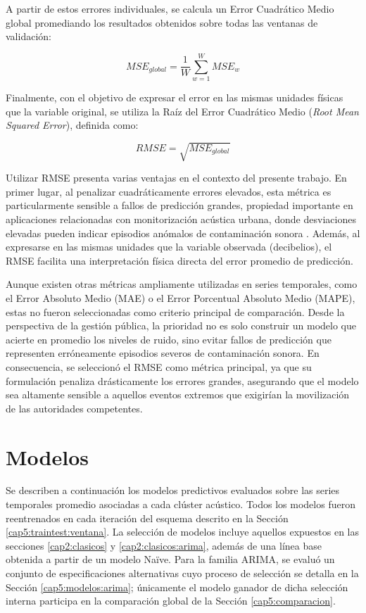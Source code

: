 A partir de estos errores individuales, se calcula un Error Cuadrático Medio global promediando los resultados obtenidos sobre todas las ventanas de validación:

\begin{equation}
    MSE_{global} = \frac{1}{W}\sum_{w=1}^{W} MSE_w
    \label{eq:mse_global}
\end{equation}

Finalmente, con el objetivo de expresar el error en las mismas unidades físicas que la variable original, se utiliza la Raíz del Error Cuadrático Medio (\textit{Root Mean Squared Error}), definida como:

\begin{equation}
    RMSE = \sqrt{MSE_{global}}
    \label{eq:rmse_global}
\end{equation}

Utilizar RMSE presenta varias ventajas en el contexto del presente trabajo. En primer lugar, al penalizar cuadráticamente errores elevados, esta métrica es particularmente sensible a fallos de predicción grandes, propiedad importante en aplicaciones relacionadas con monitorización acústica urbana, donde desviaciones elevadas pueden indicar episodios anómalos de contaminación sonora \parencite{ChaiDraxler2014}. Además, al expresarse en las mismas unidades que la variable observada (decibelios), el RMSE facilita una interpretación física directa del error promedio de predicción.

Aunque existen otras métricas ampliamente utilizadas en series temporales, como el Error Absoluto Medio (MAE) o el Error Porcentual Absoluto Medio (MAPE), estas no fueron seleccionadas como criterio principal de comparación. Desde la perspectiva de la gestión pública, la prioridad no es solo construir un modelo que acierte en promedio los niveles de ruido, sino evitar fallos de predicción que representen erróneamente episodios severos de contaminación sonora. En consecuencia, se seleccionó el RMSE como métrica principal, ya que su formulación penaliza drásticamente los errores grandes, asegurando que el modelo sea altamente sensible a aquellos eventos extremos que exigirían la movilización de las autoridades competentes.

\section{Modelos}
\label{cap5:modelos}

Se describen a continuación los modelos predictivos evaluados sobre las series temporales promedio asociadas a cada clúster acústico. Todos los modelos fueron reentrenados en cada iteración del esquema descrito en la Sección \ref{cap5:traintest:ventana}. La selección de modelos incluye aquellos expuestos en las secciones \ref{cap2:clasicos} y \ref{cap2:clasicos:arima}, además de una línea base obtenida a partir de un modelo Naïve. Para la familia ARIMA, se evaluó un conjunto de especificaciones alternativas cuyo proceso de selección se detalla en la Sección \ref{cap5:modelos:arima}; únicamente el modelo ganador de dicha selección interna participa en la comparación global de la Sección \ref{cap5:comparacion}.

